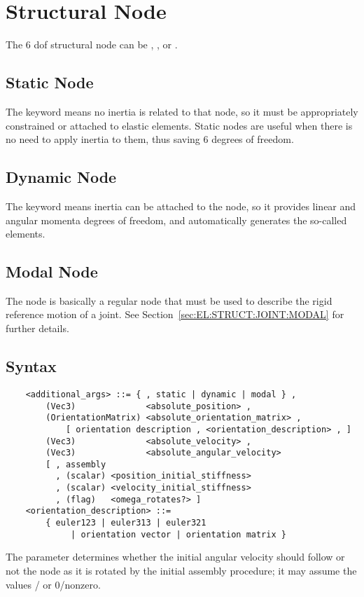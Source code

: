 \section{Structural Node}
\label{sec:NODE:STRUCTURAL}
The 6 dof structural node can be ,
,  or .

\subsection{Static Node}
\label{sec:NODE:STRUCTURAL:STATIC}
The  keyword means no inertia is related to that node, 
so it must be appropriately constrained or attached to elastic elements.
Static nodes are useful when there is no need to apply inertia
to them, thus saving 6 degrees of freedom.

\subsection{Dynamic Node}
\label{sec:NODE:STRUCTURAL:DYNAMIC}
The  keyword means inertia can be attached to the node, 
so it provides linear and angular momenta degrees of freedom, 
and automatically generates the so-called 
elements.

\subsection{Modal Node}
\label{sec:NODE:STRUCTURAL:MODAL}
The  node is basically a regular  node
that must be used to describe the rigid reference motion
of a  joint.
See Section~\ref{sec:EL:STRUCT:JOINT:MODAL} for further details.

\subsection{Syntax}
\label{sec:NODE:STRUCTURAL:SYNTAX}
\begin{verbatim}
    <additional_args> ::= { , static | dynamic | modal } ,
        (Vec3)              <absolute_position> ,
        (OrientationMatrix) <absolute_orientation_matrix> ,
            [ orientation description , <orientation_description> , ]
        (Vec3)              <absolute_velocity> ,
        (Vec3)              <absolute_angular_velocity>
        [ , assembly
          , (scalar) <position_initial_stiffness>
          , (scalar) <velocity_initial_stiffness>
          , (flag)   <omega_rotates?> ]
    <orientation_description> ::=
        { euler123 | euler313 | euler321
             | orientation vector | orientation matrix }
\end{verbatim}
The  parameter determines whether 
the initial angular velocity should follow or not the node 
as it is rotated by the initial assembly procedure; it may assume 
the values / or 0/nonzero.


